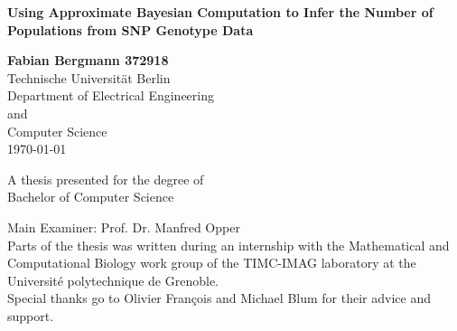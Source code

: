 \documentclass[a4paper, 11pt]{article}
\newcommand{\datum}{\today}
\begin{document}
\begin{titlepage}
   \begin{center}
       \vspace*{0.5cm}
 
       \vspace{0.5cm}
       \huge
        \textbf{Using Approximate Bayesian Computation to Infer the Number of Populations from SNP Genotype Data}
 
       \vspace{1.5cm}
 		\Large
       \textbf{Fabian Bergmann 372918}\\
       \vspace{1cm}
       Technische Universität Berlin\\
       Department of Electrical Engineering\\and\\Computer Science\\
       \vspace{1cm}
       \datum \\
       
 
       \vfill
 
       A thesis presented for the degree of\\
       Bachelor of Computer Science
 
       \vspace{0.8cm}
        
       Main Examiner: Prof. Dr. Manfred Opper\\
       
       \vspace{1.5cm}
       Parts of the thesis was written during an internship with the Mathematical and Computational Biology work group of the TIMC-IMAG laboratory at the Université polytechnique de Grenoble.\\ \vspace{0.2cm}
       Special thanks go to Olivier Fran\c{c}ois and Michael Blum for their advice and support.
 
   \end{center}
\end{titlepage}
	
	\newpage
	
\renewcommand{\labelenumii}{(\roman{enumii})}
\end{document}
